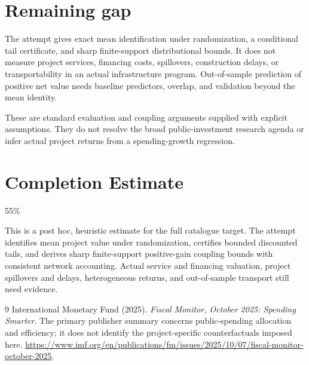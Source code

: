 \documentclass[11pt,a4paper]{article}
\begin{document}
\section{Remaining gap}
The attempt gives exact mean identification under randomization, a conditional tail certificate, and sharp finite-support distributional bounds. It does not measure project services, financing costs, spillovers, construction delays, or transportability in an actual infrastructure program. Out-of-sample prediction of positive net value needs baseline predictors, overlap, and validation beyond the mean identity.

These are standard evaluation and coupling arguments supplied with explicit assumptions. They do not resolve the broad public-investment research agenda or infer actual project returns from a spending-growth regression.

\section{Completion Estimate}
55\%

This is a post hoc, heuristic estimate for the full catalogue target.
The attempt identifies mean project value under randomization, certifies bounded discounted tails, and derives sharp finite-support positive-gain coupling bounds with consistent network accounting. Actual service and financing valuation, project spillovers and delays, heterogeneous returns, and out-of-sample transport still need evidence.

\begin{thebibliography}{9}
 International Monetary Fund (2025).
\emph{Fiscal Monitor, October 2025: Spending Smarter}.
The primary publisher summary concerns public-spending allocation and efficiency; it does not identify the project-specific counterfactuals imposed here.
\url{https://www.imf.org/en/publications/fm/issues/2025/10/07/fiscal-monitor-october-2025}.
\end{thebibliography}
\end{document}
